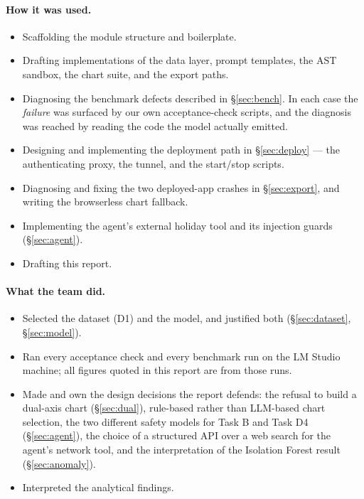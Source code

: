 \documentclass[11pt,a4paper]{article}
\begin{document}
\paragraph{How it was used.}
\begin{itemize}[leftmargin=*]
\item Scaffolding the module structure and boilerplate.
\item Drafting implementations of the data layer, prompt templates, the AST sandbox, the
      chart suite, and the export paths.
\item Diagnosing the benchmark defects described in \S\ref{sec:bench}. In each case the
      \emph{failure} was surfaced by our own acceptance-check scripts, and the diagnosis
      was reached by reading the code the model actually emitted.
\item Designing and implementing the deployment path in \S\ref{sec:deploy} --- the
      authenticating proxy, the tunnel, and the start/stop scripts.
\item Diagnosing and fixing the two deployed-app crashes in \S\ref{sec:export}, and
      writing the browserless chart fallback.
\item Implementing the agent's external holiday tool and its injection guards
      (\S\ref{sec:agent}).
\item Drafting this report.
\end{itemize}

\paragraph{What the team did.}
\begin{itemize}[leftmargin=*]
\item Selected the dataset (D1) and the model, and justified both
      (\S\ref{sec:dataset}, \S\ref{sec:model}).
\item Ran every acceptance check and every benchmark run on the LM Studio machine; all
      figures quoted in this report are from those runs.
\item Made and own the design decisions the report defends: the refusal to build a
      dual-axis chart (\S\ref{sec:dual}), rule-based rather than LLM-based chart
      selection, the two different safety models for Task B and Task D4
      (\S\ref{sec:agent}), the choice of a structured API over a web search for the
      agent's network tool, and the interpretation of the Isolation Forest result
      (\S\ref{sec:anomaly}).
\item Interpreted the analytical findings.
\end{itemize}
\end{document}
